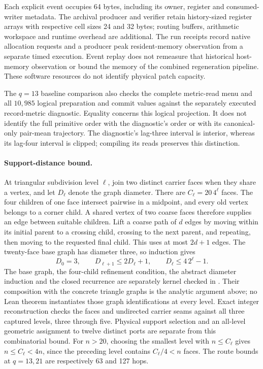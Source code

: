 Each explicit event occupies 64 bytes, including its owner, register and
consumed-writer metadata. The archival producer and verifier retain
history-sized register arrays with respective cell sizes 24 and 32 bytes;
routing buffers, arithmetic workspace and runtime overhead are additional.
The run receipts record native allocation requests and a producer peak
resident-memory observation from a separate timed execution. Event replay
does not remeasure that historical host-memory observation or bound the
memory of the combined regeneration pipeline. These software resources
do not identify physical patch capacity.

The $q=13$ baseline comparison also checks the complete metric-read menu
and all $10{,}985$ logical preparation and commit values against the
separately executed record-metric diagnostic. Equality concerns this
logical projection. It does not identify the full primitive order with
the diagnostic's order or with its canonical-only pair-mean trajectory.
The diagnostic's lag-three interval is interior, whereas its lag-four
interval is clipped; compiling its reads preserves this distinction.

\paragraph{Support-distance bound.}
At triangular subdivision level $\ell$, join two distinct carrier faces
when they share a vertex, and let $D_\ell$ denote the graph diameter.
There are $C_\ell=20\,4^\ell$ faces. The four children of one face
intersect pairwise in a midpoint, and every old vertex belongs to a
corner child. A shared vertex of two coarse faces therefore supplies an
edge between suitable children. Lift a coarse path of $d$ edges by moving
within its initial parent to a crossing child, crossing to the next
parent, and repeating, then moving to the requested final child. This
uses at most $2d+1$ edges. The twenty-face base graph has diameter three,
so induction gives
\[
 D_0=3,\qquad D_{\ell+1}\leq2D_\ell+1,
 \qquad D_\ell\leq4\,2^\ell-1.
\]
The base graph, the four-child refinement condition, the abstract
diameter induction and the closed recurrence are separately kernel
checked in . Their
composition with the concrete triangle graphs is the analytic argument
above; no Lean theorem instantiates those graph identifications at every
level. Exact integer reconstruction checks the faces and undirected
carrier seams against all three captured levels, three through five.
Physical support selection and an all-level geometric assignment to
twelve distinct ports are separate from this combinatorial bound.
For $n>20$, choosing the smallest level with $n\leq C_\ell$ gives
$n\leq C_\ell<4n$, since the preceding level contains $C_\ell/4<n$
faces. The route bounds at $q=13,21$ are respectively 63 and 127 hops.

